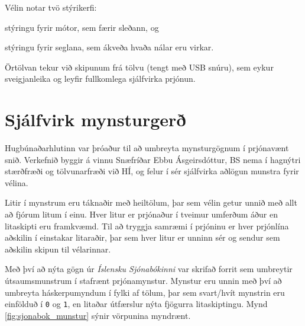 \documentclass[a4paper,10pt,twocolumn]{article}
\begin{document}
Vélin notar tvö stýrikerfi: \begin{enumerate*}[label=(\roman*)] 
\item stýringu fyrir mótor, sem færir sleðann, og \item stýringu fyrir seglana, sem ákveða hvaða nálar eru virkar. 
\end{enumerate*} Örtölvan tekur við skipunum frá tölvu (tengt með USB snúru), sem eykur sveigjanleika og leyfir fullkomlega sjálfvirka prjónun. 

\section{Sjálfvirk mynsturgerð}
Hugbúnaðarhlutinn var þróaður til að umbreyta mynsturgögnum í prjónavænt snið.
Verkefnið byggir á vinnu Snæfríðar Ebbu Ásgeirsdóttur, BS nema í hagnýtri stærðfræði
og tölvunarfræði við HÍ, og felur í sér sjálfvirka aðlögun munstra fyrir vélina.

Litir í mynstrum eru táknaðir með heiltölum, þar sem vélin getur unnið með allt að 
fjórum litum í einu. Hver litur er prjónaður í tveimur umferðum áður en litaskipti 
eru framkvæmd. Til að tryggja samræmi í prjóninu er hver prjónlína aðskilin í 
einstakar litaraðir, þar sem hver litur er unninn sér og sendur sem aðskilin 
skipun til vélarinnar.

Með því að nýta gögn úr \emph{Íslensku Sjónabókinni} \cite{sjonabok} var skrifað 
forrit sem umbreytir útsaumsmunstrum í stafrænt prjónamynstur. Mynstur eru unnin 
með því að umbreyta háskerpumyndum í fylki af tölum, þar sem svart/hvít mynstrin 
eru einfölduð í \texttt{0} og \texttt{1}, en litaðar útfærslur nýta fjögurra litaskiptingu. Mynd \ref{fig:sjonabok_munstur} sýnir vörpunina myndrænt.
\end{document}
